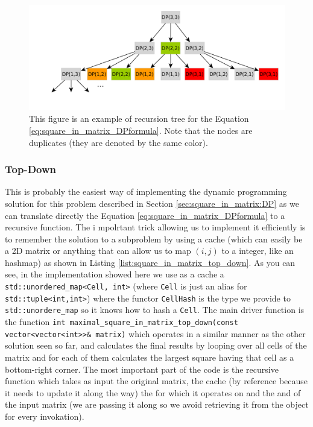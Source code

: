 \begin{figure}
	\centering
	\label{fig:square_in_matrix:recursiontree}
	\includegraphics[width=\textwidth]{sources/square_in_matrix/images/recursiontree}
	\caption{This figure is an example of recursion tree for the Equation
	\ref{eq:square_in_matrix_DPformula}. Note that the nodes are duplicates (they are denoted by the
	same color). }
\end{figure}

\subsubsection{Top-Down}
\label{sec:square_in_matrix:top_down}
This is probably the easiest way of implementing the dynamic programming solution for this problem
described in Section \ref{sec:square_in_matrix:DP} as we can translate directly the Equation
\ref{eq:square_in_matrix_DPformula} to a recursive function. The i mpolrtant
trick allowing us to implement it efficiently is to remember the solution
to a subproblem by using a cache (which can easily be a 2D matrix or anything that can allow us to
map $(i,j)$ to a integer, like an hashmap) as shown in Listing
\ref{list:square_in_matrix_top_down}.
As you can see, in the implementation showed here we use as a cache a
\lstinline[columns=fixed]{std::unordered_map<Cell, int>} (where \lstinline[columns=fixed]{Cell} is
just an alias for \lstinline[columns=fixed]{std::tuple<int,int>}) where the functor
\lstinline[columns=fixed]{CellHash}
is the type we provide to \lstinline[columns=fixed]{std::unordere_map} so it knows how to hash a
\lstinline[columns=fixed]{Cell}. The main driver function is the function
\lstinline[columns=fixed]{int maximal_square_in_matrix_top_down(const vector<vector<int>>& matrix)}
which operates in a similar manner as the other solution seen so far, and calculates the final
results by looping over all cells of the matrix and for each of them calculates the largest square
having that cell as a bottom-right corner. The most important part of the code is the recursive
function 
which takes as input the original matrix, the cache (by reference because it
needs to update it along the way) the  for which it operates on and
the  and  of the input matrix (we are passing it along
so we avoid retrieving it from the  object for every invokation).

